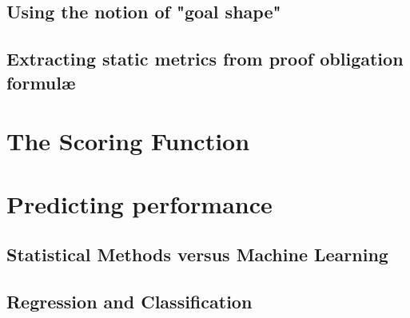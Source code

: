 \subsection{Using the \why{} notion of "goal shape"}
\subsection{Extracting static metrics from \why{} proof obligation formul\ae}

\section{The Scoring Function}
\subsection{}

\section{Predicting performance}
\subsection{Statistical Methods versus Machine Learning}
\subsection{Regression and Classification}
\ 


